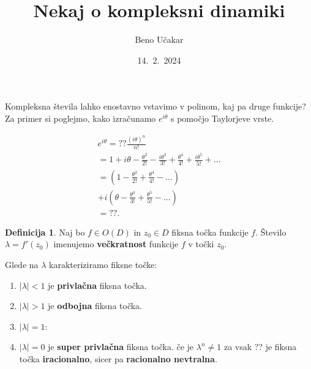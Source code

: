 \documentclass{beamer}
\title{Nekaj o kompleksni dinamiki}
\author{Beno Učakar}
\date{14.\ 2.\ 2024}
\theoremstyle{definition}
\newtheorem{definicija}{Definicija}
\begin{document}
\maketitle

\begin{frame}
    Kompleksna števila lahko enostavno vstavimo v polinom, kaj pa druge funkcije? 
    Za primer si poglejmo, kako izračunamo $e^{i\theta}$ s pomočjo Taylorjeve vrste.
    
    \begin{align*}
         e^{i\theta} = ?? \frac{(i\theta)^n}{n!} \\
                    = 1 + i\theta - \frac{\theta^2}{2!} - \frac{i\theta^3}{3!} + \frac{\theta^4}{4!} + \frac{i\theta^5}{5!} + \ldots \\
                    = \left( 1 - \frac{\theta^2}{2!} + \frac{\theta^4}{4!} - \ldots \right) \\
                       + i \left(\theta - \frac{\theta^3}{3!} + \frac{\theta^5}{5!} - \ldots \right) \\
                    = ??.
    \end{align*}
       
\end{frame}

\begin{frame}

    \begin{definicija}
    Naj bo $f \in O(D)$ in $z_0 \in D$ fiksna točka funkcije $f$.
        Število $\lambda = f'(z_0)$ imenujemo \textbf{večkratnost} funkcije $f$ v točki $z_0$.
    \end{definicija}
        
    

    \begin{exampleblock}{Glede na $\lambda$ karakteriziramo fiksne točke:}
        \begin{enumerate} 
            \item $|\lambda| < 1$ je \textbf{privlačna} fiksna točka.
            \item $|\lambda| > 1$ je \textbf{odbojna} fiksna točka.
            \item $|\lambda| = 1$: 
            \item $|\lambda| = 0$ je \textbf{super privlačna} fiksna točka.
                če je $\lambda^n \neq 1$ za vsak ?? je fiksna točka \textbf{iracionalno},
                sicer pa \textbf{racionalno nevtralna}.
        \end{enumerate}
    \end{exampleblock}
\end{frame}
\end{document}
